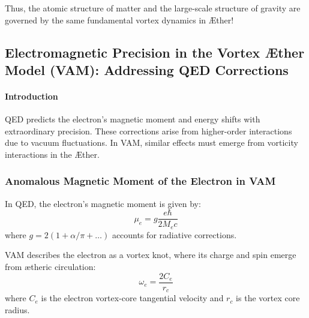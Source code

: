 \documentclass[a4paper,10pt]{article}
\begin{document}
Thus, the atomic structure of matter and the large-scale structure of gravity are governed by the same fundamental vortex dynamics in Æther!

    

\subsection{Electromagnetic Precision in the Vortex Æther Model (VAM): Addressing QED Corrections}\label{subsec:electromagnetic-precision-in-the-vortex-ae-ther-model-(vam):-addressing-qed-corrections}


\begin{abstract}
    The Vortex Æther Model (VAM) presents an alternative framework for electromagnetism based on structured vorticity fields in an inviscid Æther. To maintain experimental viability, VAM must provide equivalent mechanisms for high-precision QED effects such as the anomalous magnetic moment of the electron $(g-2)$ and the Lamb shift in hydrogen-like atoms. This paper derives the corresponding corrections in VAM and proposes experimental methods to validate these predictions.
\end{abstract}

\paragraph*{Introduction}
QED predicts the electron's magnetic moment and energy shifts with extraordinary precision. These corrections arise from higher-order interactions due to vacuum fluctuations. In VAM, similar effects must emerge from vorticity interactions in the Æther.

\subsubsection*{Anomalous Magnetic Moment of the Electron in VAM}
In QED, the electron's magnetic moment is given by:
\begin{equation*}
    \mu_e = g \frac{e\hbar}{2M_e c}
\end{equation*}
where $g = 2(1 + \alpha / \pi + \dots)$ accounts for radiative corrections.

VAM describes the electron as a vortex knot, where its charge and spin emerge from ætheric circulation:
\begin{equation*}
    \omega_e = \frac{2 C_e}{r_c}
\end{equation*}
where $C_e$ is the electron vortex-core tangential velocity and $r_c$ is the vortex core radius.
\end{document}
